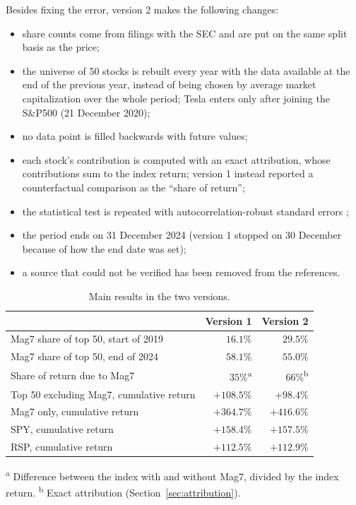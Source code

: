 \documentclass[12pt, a4paper]{article}
\begin{document}
Besides fixing the error, version 2 makes the following changes:
\begin{itemize}
  \item share counts come from filings with the SEC \citep{secedgar} and are put on the same split basis as the price;
  \item the universe of 50 stocks is rebuilt every year with the data available at the end of the previous year, instead of being chosen by average market capitalization over the whole period; Tesla enters only after joining the S\&P500 (21 December 2020);
  \item no data point is filled backwards with future values;
  \item each stock's contribution is computed with an exact attribution, whose contributions sum to the index return; version 1 instead reported a counterfactual comparison as the ``share of return'';
  \item the statistical test is repeated with autocorrelation-robust standard errors \citep{neweywest1987};
  \item the period ends on 31 December 2024 (version 1 stopped on 30 December because of how the end date was set);
  \item a source that could not be verified has been removed from the references.
\end{itemize}

\begin{table}[H]
  \centering
  \caption{Main results in the two versions.}
  \begin{tabular}{lrr}
    \toprule
    & Version 1 & Version 2 \\
    \midrule
    Mag7 share of top 50, start of 2019     & $16.1\%$  & $29.5\%$ \\
    Mag7 share of top 50, end of 2024       & $58.1\%$  & $55.0\%$ \\
    Share of return due to Mag7             & $35\%$\textsuperscript{a} & $66\%$\textsuperscript{b} \\
    Top 50 excluding Mag7, cumulative return & $+108.5\%$ & $+98.4\%$ \\
    Mag7 only, cumulative return            & $+364.7\%$ & $+416.6\%$ \\
    SPY, cumulative return                  & $+158.4\%$ & $+157.5\%$ \\
    RSP, cumulative return                  & $+112.5\%$ & $+112.9\%$ \\
    \bottomrule
  \end{tabular}
  \par\smallskip
  \footnotesize\textsuperscript{a} Difference between the index with and without Mag7, divided by the index return. \textsuperscript{b} Exact attribution (Section~\ref{sec:attribution}).
  \label{tab:revision}
\end{table}
\end{document}
